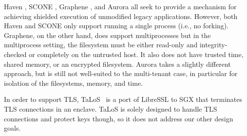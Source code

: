 Haven \cite{baumann2015shielding}, SCONE \cite{199364}, Graphene
\cite{graphene}, and Aurora \cite{liang2018aurora} all seek to provide a
mechanism for achieving shielded execution of unmodified legacy applications.
However, both Haven and SCONE only support running a single process (i.e., no
forking).  Graphene, on the other hand, does support multiprocesses but in the
multiprocess setting, the filesystem must be either read-only and
integrity-checked or completely on the untrusted host. It also does not have
trusted time, shared memory, or an encrypted filesystem.  Aurora takes a
slightly different approach, but is still not well-suited to the multi-tenant
case, in particular for isolation of the filesystems, memory, and time.

In order to support TLS, TaLoS~\cite{talos} is a port of LibreSSL to SGX that
terminates TLS connections in an enclave.  TaLoS is solely designed to handle
TLS connections and protect keys though, so it does not address our other
design goals.
%
%
%





